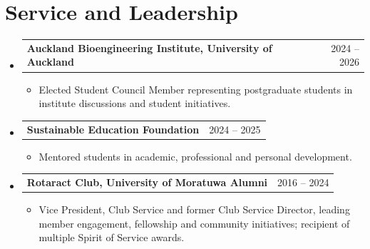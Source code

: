 \documentclass[a4paper,10pt]{article}
\makeatletter
\newcommand{\resumeProjectHeading}[2]{
  \vspace{-2pt}\item
    \begin{tabular*}{0.97\textwidth}[t]{l@{\extracolsep{\fill}}r}
      #1 & #2 \\
    \end{tabular*}\vspace{-7pt}
}
\newcommand{\resumeSubHeadingListStart}{\begin{itemize}[leftmargin=0.15in,label={}]}
\newcommand{\resumeSubHeadingListEnd}{\end{itemize}}
\newcommand{\resumeItem}[1]{\item \small #1}
\newcommand{\resumeItemListStart}{\begin{itemize}[itemsep=0.5pt,parsep=0pt,topsep=1.0pt,partopsep=0pt]}
\newcommand{\resumeItemListEnd}{\end{itemize}\vspace{-5.5pt}}
\makeatother
\begin{document}
\section{Service and Leadership}
\resumeSubHeadingListStart
\resumeProjectHeading{\textbf{Auckland Bioengineering Institute, University of Auckland}}{2024 -- 2026}
\resumeItemListStart
\resumeItem{Elected Student Council Member representing postgraduate students in institute discussions and student initiatives.}
\resumeItemListEnd
\resumeProjectHeading{\textbf{Sustainable Education Foundation}}{2024 -- 2025}
\resumeItemListStart
\resumeItem{Mentored students in academic, professional and personal development.}
\resumeItemListEnd
\resumeProjectHeading{\textbf{Rotaract Club, University of Moratuwa Alumni}}{2016 -- 2024}
\resumeItemListStart
\resumeItem{Vice President, Club Service and former Club Service Director, leading member engagement, fellowship and community initiatives; recipient of multiple Spirit of Service awards.}
\resumeItemListEnd
\resumeSubHeadingListEnd
\end{document}
